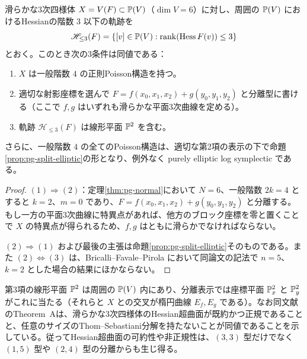 \begin{corollary}
\label{cor:pg-cubic-fourfold-elliptic}
滑らかな3次四様体 $X=V(F)\subset\mathbb P(V)$（$\dim V=6$）に対し、周囲の $\mathbb P(V)$ におけるHessianの階数 $3$ 以下の軌跡を
\begin{equation}\label{eq:pg-fourfold-hessian-rank-three}
\mathscr H_{\le3}(F)=
\{[v]\in\mathbb P(V):\operatorname{rank}(\operatorname{Hess}F(v))\le3\}
\end{equation}
とおく。このとき次の3条件は同値である：
\begin{enumerate}
\item $X$ は一般階数 $4$ の正則Poisson構造を持つ。
\item 適切な射影座標を選んで $F=f(x_0,x_1,x_2)+g(y_0,y_1,y_2)$ と分離型に書ける（ここで $f,g$ はいずれも滑らかな平面3次曲線を定める）。
\item 軌跡 $\mathscr H_{\le3}(F)$ は線形平面 $\mathbb P^2$ を含む。
\end{enumerate}
さらに、一般階数 $4$ の全てのPoisson構造は、適切な第2項の表示の下で命題\ref{prop:pg-split-elliptic}の形となり、例外なく purely elliptic log symplectic である。
\end{corollary}
\begin{proof}
$(1)\Rightarrow(2)$：定理\ref{thm:pg-normal}において $N=6$、一般階数 $2k=4$ とすると $k=2$、$m=0$ であり、$F=f(x_0,x_1,x_2)+g(y_0,y_1,y_2)$ と分離する。もし一方の平面3次曲線に特異点があれば、他方のブロック座標を零と置くことで $X$ の特異点が得られるため、$f,g$ はともに滑らかでなければならない。

$(2)\Rightarrow(1)$ および最後の主張は命題\ref{prop:pg-split-elliptic}そのものである。また $(2)\Leftrightarrow(3)$ は、Bricalli--Favale--Pirola \cite[Theorem~3.4, pp.~10--12]{PBricalliFavalePirola} において同論文の記法で $n=5$、$k=2$ とした場合の結果にほかならない。
\end{proof}

\begin{remark}\label{rem:pg-fourfold-ts-hessian-scope}
第3項の線形平面 $\mathbb P^2$ は周囲の $\mathbb P(V)$ 内にあり、分離表示では座標平面 $\mathbb P^2_x$ と $\mathbb P^2_y$ がこれに当たる（それらと $X$ との交叉が楕円曲線 $E_f,E_g$ である）。なお同文献のTheorem~Aは、滑らかな3次四様体のHessian超曲面が既約かつ正規であることと、任意のサイズのThom--Sebastiani分解を持たないことが同値であることを示している。従ってHessian超曲面の可約性や非正規性は、$(3,3)$ 型だけでなく $(1,5)$ 型や $(2,4)$ 型の分離からも生じ得る。
\end{remark}


